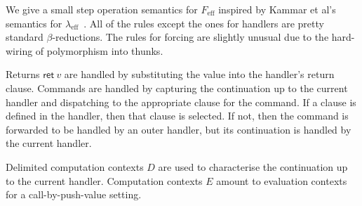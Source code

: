 \documentclass[preprint]{sigplanconf}
\newcommand{\lameff}{$\lambda_\mathrm{eff}$\xspace}
\newcommand{\feff}{$F_\textrm{eff}$\xspace}
\newcommand{\key}[1]{\mathsf{#1}}
\begin{document}
We give a small step operation semantics for \feff inspired by Kammar
et al's semantics for \lameff~\cite{KammarLO13}.
%
All of the rules except the ones for handlers are pretty standard
$\beta$-reductions.
%
The rules for forcing are slightly unusual due to the hard-wiring of
polymorphism into thunks.

Returns $\key{ret}~v$ are handled by substituting the value into the
handler's return clause. Commands are handled by capturing the
continuation up to the current handler and dispatching to the
appropriate clause for the command. If a clause is defined in the
handler, then that clause is selected. If not, then the command is
forwarded to be handled by an outer handler, but its continuation is
handled by the current handler.

Delimited computation contexts $D$ are used to characterise the
continuation up to the current handler. Computation contexts $E$
amount to evaluation contexts for a call-by-push-value setting.
\end{document}
